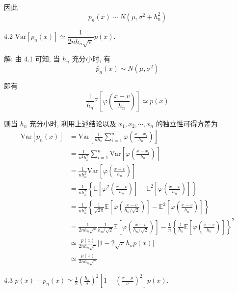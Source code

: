 \documentclass{article}
\begin{document}
因此
\begin{equation}
  \bar{p}_n(x)\sim N(\mu,\sigma^2+h_n^2)
\end{equation}

4.2 $\text{Var}[p_n(x)]\simeq\dfrac{1}{2nh_n\sqrt{\pi}}p(x)$.

解: 由 4.1 可知, 当 $h_n$ 充分小时, 有
\begin{equation}
  \bar{p}_n(x)\sim N(\mu,\sigma^2)
\end{equation}

即有
\begin{equation}
  \frac{1}{h_n}\mathbb{E}\left[\varphi\left(\frac{x-v}{h_{n}}\right)\right]\simeq p(x)
\end{equation}

则当 $h_n$ 充分小时, 利用上述结论以及 $x_1,x_2,\cdots,x_n$ 的独立性可得方差为
\begin{equation}
  \begin{aligned}
    \text{Var}[p_n(x)]
    &=\text{Var}\left[\frac{1}{nh_n}\sum_{i=1}^{n} \varphi\left(\frac{x-x_{i}}{h_{n}}\right)\right]\\
    &=\frac{1}{n^2h_n^2}\sum_{i=1}^{n}\text{Var} \left[\varphi\left(\frac{x-x_{i}}{h_{n}}\right)\right]\\
    &=\frac{1}{nh_n^2}\text{Var} \left[\varphi\left(\frac{x-v}{h_{n}}\right)\right]\\
    &=\frac{1}{nh_n^2}\left\{\mathbb{E}\left[\varphi^2\left(\frac{x-v}{h_{n}}\right)\right]-\mathbb{E}^2\left[\varphi\left(\frac{x-v}{h_{n}}\right)\right]\right\}\\
    &=\frac{1}{nh_n^2}\left\{\frac{1}{\sqrt{2\pi}}\mathbb{E}\left[\varphi\left(\frac{x-v}{h_{n}/\sqrt{2}}\right)\right]-\mathbb{E}^2\left[\varphi\left(\frac{x-v}{h_{n}}\right)\right]\right\}\\
    &=\frac{1}{2nh_n\sqrt{\pi}}\frac{1}{h_n/\sqrt{2}}\mathbb{E}\left[\varphi\left(\frac{x-v}{h_{n}/\sqrt{2}}\right)\right]-\frac{1}{n}\left\{\frac{1}{h_n}\mathbb{E}\left[\varphi\left(\frac{x-v}{h_{n}}\right)\right]\right\}^2\\
    &\simeq\frac{p(x)}{2nh_n\sqrt{\pi}}\Big[1-2\sqrt{\pi}h_np(x)\Big]\\
    &\simeq\frac{p(x)}{2nh_n\sqrt{\pi}}
  \end{aligned}
\end{equation}

4.3 $\displaystyle p(x)-\bar{p}_{n}(x) \simeq \frac{1}{2}\left(\frac{h_{n}}{\sigma}\right)^{2}\left[1-\left(\frac{x-\mu}{\sigma}\right)^{2}\right] p(x)$.
\end{document}
